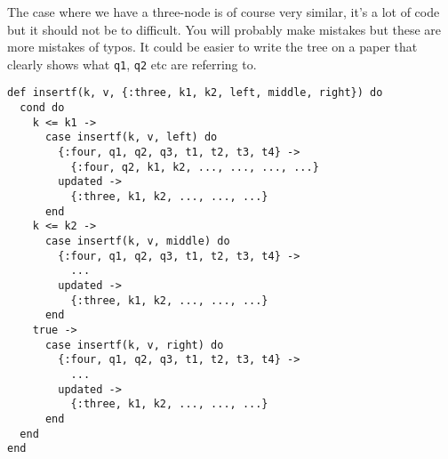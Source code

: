 \documentclass[a4paper,11pt]{article}
\begin{document}
The case where we have a three-node is of course very similar, it's a
lot of code but it should not be to difficult. You will probably make
mistakes but these are more mistakes of typos. It could be easier to
write the tree on a paper that clearly shows what {\tt q1}, {\tt q2}
etc are referring to.

\begin{verbatim}
def insertf(k, v, {:three, k1, k2, left, middle, right}) do
  cond do
    k <= k1 ->
      case insertf(k, v, left) do
        {:four, q1, q2, q3, t1, t2, t3, t4} ->
          {:four, q2, k1, k2, ..., ..., ..., ...}
        updated ->
          {:three, k1, k2, ..., ..., ...}
      end
    k <= k2 ->
      case insertf(k, v, middle) do
        {:four, q1, q2, q3, t1, t2, t3, t4} ->
          ...
        updated ->
          {:three, k1, k2, ..., ..., ...}
      end
    true ->
      case insertf(k, v, right) do
        {:four, q1, q2, q3, t1, t2, t3, t4} ->
          ...
        updated ->
          {:three, k1, k2, ..., ..., ...}
      end
  end
end
\end{verbatim}
\end{document}
